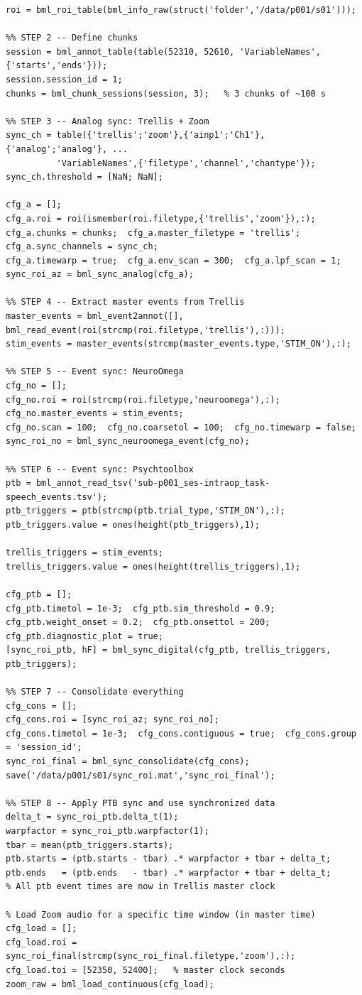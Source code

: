 \documentclass[11pt, a4paper]{article}
\begin{document}
\begin{lstlisting}[style=matlab, caption={Complete synchronization script: Trellis + Zoom + NeuroOmega + Psychtoolbox}]
%% STEP 1 -- Build initial ROI
roi = bml_roi_table(bml_info_raw(struct('folder','/data/p001/s01')));

%% STEP 2 -- Define chunks
session = bml_annot_table(table(52310, 52610, 'VariableNames',{'starts','ends'}));
session.session_id = 1;
chunks = bml_chunk_sessions(session, 3);   % 3 chunks of ~100 s

%% STEP 3 -- Analog sync: Trellis + Zoom
sync_ch = table({'trellis';'zoom'},{'ainp1';'Ch1'},{'analog';'analog'}, ...
          'VariableNames',{'filetype','channel','chantype'});
sync_ch.threshold = [NaN; NaN];

cfg_a = [];
cfg_a.roi = roi(ismember(roi.filetype,{'trellis','zoom'}),:);
cfg_a.chunks = chunks;  cfg_a.master_filetype = 'trellis';
cfg_a.sync_channels = sync_ch;
cfg_a.timewarp = true;  cfg_a.env_scan = 300;  cfg_a.lpf_scan = 1;
sync_roi_az = bml_sync_analog(cfg_a);

%% STEP 4 -- Extract master events from Trellis
master_events = bml_event2annot([], bml_read_event(roi(strcmp(roi.filetype,'trellis'),:)));
stim_events = master_events(strcmp(master_events.type,'STIM_ON'),:);

%% STEP 5 -- Event sync: NeuroOmega
cfg_no = [];
cfg_no.roi = roi(strcmp(roi.filetype,'neuroomega'),:);
cfg_no.master_events = stim_events;
cfg_no.scan = 100;  cfg_no.coarsetol = 100;  cfg_no.timewarp = false;
sync_roi_no = bml_sync_neuroomega_event(cfg_no);

%% STEP 6 -- Event sync: Psychtoolbox
ptb = bml_annot_read_tsv('sub-p001_ses-intraop_task-speech_events.tsv');
ptb_triggers = ptb(strcmp(ptb.trial_type,'STIM_ON'),:);
ptb_triggers.value = ones(height(ptb_triggers),1);

trellis_triggers = stim_events;
trellis_triggers.value = ones(height(trellis_triggers),1);

cfg_ptb = [];
cfg_ptb.timetol = 1e-3;  cfg_ptb.sim_threshold = 0.9;
cfg_ptb.weight_onset = 0.2;  cfg_ptb.onsettol = 200;
cfg_ptb.diagnostic_plot = true;
[sync_roi_ptb, hF] = bml_sync_digital(cfg_ptb, trellis_triggers, ptb_triggers);

%% STEP 7 -- Consolidate everything
cfg_cons = [];
cfg_cons.roi = [sync_roi_az; sync_roi_no];
cfg_cons.timetol = 1e-3;  cfg_cons.contiguous = true;  cfg_cons.group = 'session_id';
sync_roi_final = bml_sync_consolidate(cfg_cons);
save('/data/p001/s01/sync_roi.mat','sync_roi_final');

%% STEP 8 -- Apply PTB sync and use synchronized data
delta_t = sync_roi_ptb.delta_t(1);
warpfactor = sync_roi_ptb.warpfactor(1);
tbar = mean(ptb_triggers.starts);
ptb.starts = (ptb.starts - tbar) .* warpfactor + tbar + delta_t;
ptb.ends   = (ptb.ends   - tbar) .* warpfactor + tbar + delta_t;
% All ptb event times are now in Trellis master clock

% Load Zoom audio for a specific time window (in master time)
cfg_load = [];
cfg_load.roi = sync_roi_final(strcmp(sync_roi_final.filetype,'zoom'),:);
cfg_load.toi = [52350, 52400];   % master clock seconds
zoom_raw = bml_load_continuous(cfg_load);
\end{lstlisting}
\end{document}
